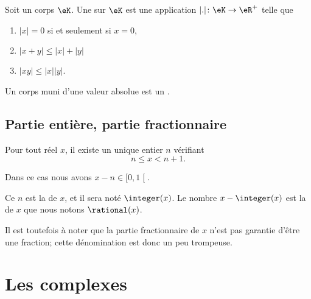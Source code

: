 \begin{definition}       \label{DEFooBWXXooAkBBRS}
    Soit un corps \( \eK\). Une  sur \(\eK\) est une application \( | . |\colon \eK\to \eR^+\) telle que
    \begin{enumerate}
        \item
            \( | x |=0\) si et seulement si \( x=0\),
        \item
            \( | x+y |\leq | x |+| y |\)
        \item
            \( | xy |\leq | x | | y |\).
    \end{enumerate}
    Un corps muni d'une valeur absolue est un .
\end{definition}


\subsection{Partie entière, partie fractionnaire}

\begin{lemmaDef}      \label{LEMooLEXTooGAQxGB}
    Pour tout réel \( x\), il existe un unique entier \( n\) vérifiant
    \begin{equation}
        n\leq x<n+1.
    \end{equation}

    Dans ce cas nous avons \( x-n\in\mathopen[ 0 , 1 \mathclose[\).

        Ce \( n\) est la  de \( x\), et il sera noté \( \integer(x)\). Le nombre \( x-\integer(x)\) est la  de \( x\) que nous notons \( \rational(x)\).

    Il est toutefois à noter que la partie fractionnaire de \( x\) n'est pas garantie d'être une fraction; cette dénomination est donc un peu trompeuse.
\end{lemmaDef}


\section{Les complexes}

